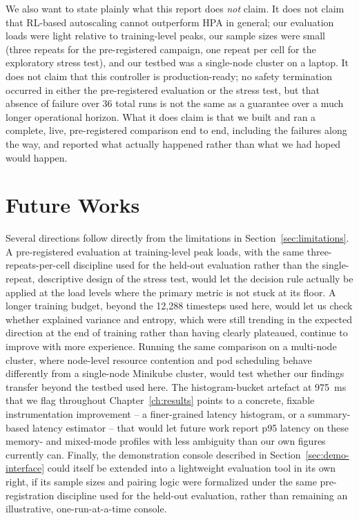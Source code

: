 We also want to state plainly what this report does \emph{not} claim. It
does not claim that RL-based autoscaling cannot outperform HPA in general;
our evaluation loads were light relative to training-level peaks, our
sample sizes were small (three repeats for the pre-registered campaign, one
repeat per cell for the exploratory stress test), and our testbed was a
single-node cluster on a laptop. It does not claim that this controller is
production-ready; no safety termination occurred in either the
pre-registered evaluation or the stress test, but that absence of failure
over 36 total runs is not the same as a guarantee over a much longer
operational horizon. What it does claim is that we built and ran a
complete, live, pre-registered comparison end to end, including the
failures along the way, and reported what actually happened rather than
what we had hoped would happen.

\section{Future Works}
\label{sec:future-works}

Several directions follow directly from the limitations in
Section~\ref{sec:limitations}. A pre-registered evaluation at
training-level peak loads, with the same three-repeats-per-cell discipline
used for the held-out evaluation rather than the single-repeat, descriptive
design of the stress test, would let the decision rule actually be applied
at the load levels where the primary metric is not stuck at its floor. A
longer training budget, beyond the 12,288 timesteps used here, would let
us check whether explained variance and entropy, which were still trending
in the expected direction at the end of training rather than having
clearly plateaued, continue to improve with more experience. Running the
same comparison on a multi-node cluster, where node-level resource
contention and pod scheduling behave differently from a single-node
Minikube cluster, would test whether our findings transfer beyond the
testbed used here. The histogram-bucket artefact at 975~ms that we flag
throughout Chapter~\ref{ch:results} points to a concrete, fixable
instrumentation improvement -- a finer-grained latency histogram, or a
summary-based latency estimator -- that would let future work report p95
latency on these memory- and mixed-mode profiles with less ambiguity than
our own figures currently can. Finally, the demonstration console
described in Section~\ref{sec:demo-interface} could itself be extended
into a lightweight evaluation tool in its own right, if its sample sizes
and pairing logic were formalized under the same pre-registration
discipline used for the held-out evaluation, rather than remaining an
illustrative, one-run-at-a-time console.
